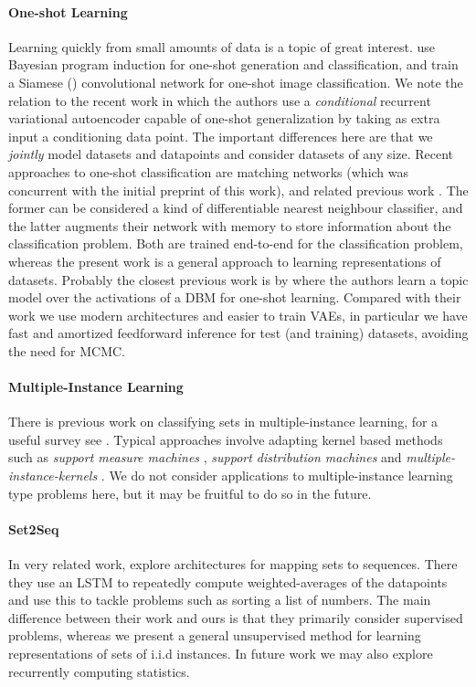 \documentclass{article} %
\newcommand{\iid}{i.i.d }
\begin{document}
\paragraph{One-shot Learning} Learning quickly from small amounts of data is a topic of great interest. \citet{omniglot} use Bayesian program induction for one-shot generation and classification, and \cite{siamese_one_shot} train a Siamese (\cite{siamese_if_you_please}) convolutional network for one-shot image classification. We note the relation to the recent work \citep{one_shot_generative} in which the authors use a \emph{conditional} recurrent variational autoencoder capable of one-shot generalization by taking as extra input a conditioning data point. The important differences here are that we \emph{jointly} model datasets and datapoints and consider datasets of any size. Recent approaches to one-shot classification are matching networks \citep{matching} (which was concurrent with the initial preprint of this work), and related previous work \citep{mann}. The former can be considered a kind of differentiable nearest neighbour classifier, and the latter augments their network with memory to store information about the classification problem. Both are trained end-to-end for the classification problem, whereas the present work is a general approach to learning representations of datasets. Probably the closest previous work is by \cite{one_shot_boltzmann} where the authors learn a topic model over the activations of a DBM for one-shot learning. Compared with their work we use modern architectures and easier to train VAEs, in particular we have fast and amortized feedforward inference for test (and training) datasets, avoiding the need for MCMC.

\paragraph{Multiple-Instance Learning}
There is previous work on classifying sets in multiple-instance learning, for a useful survey see \citet{classification_with_sets}. Typical approaches involve adapting kernel based methods such as \emph{support measure machines} \citep{support_measure_machines}, \emph{support distribution machines} \citep{support_distribution_machines} and \emph{multiple-instance-kernels} \citep{multiple_instance_kernels}. We do not consider applications to multiple-instance learning type problems here, but it may be fruitful to do so in the future.

\paragraph{Set2Seq} In very related work, \citet{set2seq} explore architectures for mapping sets to sequences. There they use an LSTM to repeatedly compute weighted-averages of the datapoints and use this to tackle problems such as sorting a list of numbers. The main difference between their work and ours is that they primarily consider supervised problems, whereas we present a general unsupervised method for learning representations of sets of \iid instances. In future work we may also explore recurrently computing statistics.
\end{document}
